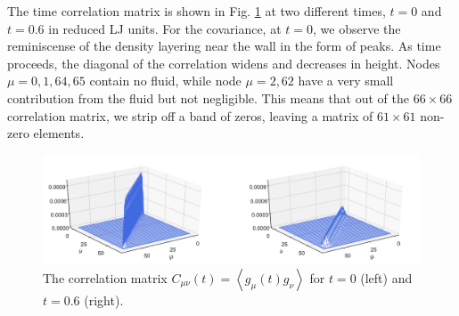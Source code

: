 \documentclass[a4paper,openright,12pt]{book}
\newcommand{\llangle}{\left\langle}
\newcommand{\rrangle}{\right\rangle}
\begin{document}
The time correlation  matrix is shown in  Fig.  \ref{fig:Ct-matrix-WALLS-66nodes} at
two different  times, $t=0$ and  $t=0.6$ in  reduced LJ units.   For the
covariance,  at $t=0$,  we  observe the  reminiscense  of the  density
layering near  the wall in the  form of peaks.  As  time proceeds, the
diagonal of  the correlation  widens and  decreases in  height.  Nodes
$\mu=0,1,64,65$ contain  no fluid, while  node $\mu=2,62$ have  a very
small  contribution  from  the  fluid but not negligible.  This means  that  out  of  the
$66\times66$ correlation matrix, we strip off a band of zeros, leaving
a matrix of $61\times61$ non-zero elements.

\begin{figure}[h!]
\centering
\includegraphics[scale=0.4]{Ct-matrix-WALLS-66nodes}
\caption[Correlation matrix $C(t)$ at $t=0$ and $t=0.6$ for confined fluid - 66 nodes.]{The   correlation    matrix   $C_{\mu\nu}(t)=\llangle
g_{\mu}(t)  g_\nu\rrangle$ for  $t=0$ (left) and $t=0.6$ (right).}
\label{fig:Ct-matrix-WALLS-66nodes}
\end{figure}
\end{document}
